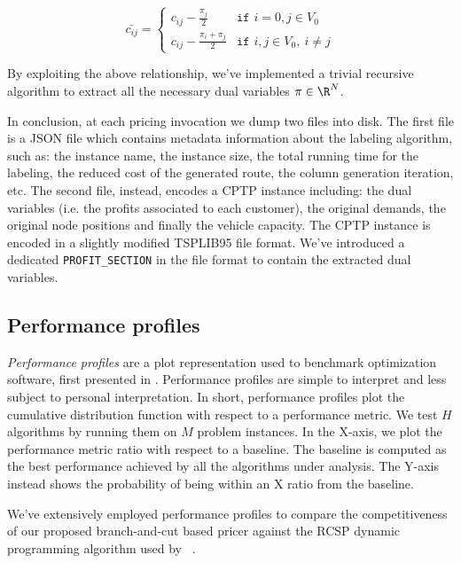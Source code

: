 \begin{equation}
	\bar{c_{ij}} = \begin{cases}
		c_{ij} - \frac{\pi_{j}}{2}       & \texttt{if } i = 0, j \in V_0       \\
		c_{ij} - \frac{\pi_i + \pi_j}{2} & \texttt{if } i, j \in V_0,\ i \ne j
	\end{cases}
\end{equation}

By exploiting the above relationship, we've implemented a trivial recursive algorithm
to extract all the necessary dual variables $\pi \in \R^N$.

In conclusion, at each pricing invocation we dump two files into disk.
The first file is a JSON file which contains metadata information about
the labeling algorithm, such as: the instance name, the instance size,
the total running time for the labeling, the reduced cost of the generated route,
the column generation iteration, etc.
The second file, instead, encodes a CPTP instance including:
the dual variables (i.e. the profits associated to each customer),
the original demands, the original node positions and finally the vehicle capacity.
The CPTP instance is encoded in a slightly modified TSPLIB95 file format.
We've introduced a dedicated \texttt{PROFIT\_SECTION} in the file format
to contain the extracted dual variables.

\subsection{Performance profiles}
\label{sec:results-performance-profiles}

\textit{Performance profiles} are a plot representation used to benchmark optimization software,
first presented in \textcite{dolan2002}.
Performance profiles are simple to interpret and less subject to personal interpretation.
In short, performance profiles plot the cumulative distribution function with respect to a performance metric.
We test $H$ algorithms by running them on $M$ problem instances.
In the X-axis, we plot the performance metric ratio with respect to a baseline.
The baseline is computed as the best performance achieved by all the algorithms under analysis.
The Y-axis instead shows the probability of being within an X ratio from the baseline.

\medskip

We've extensively employed performance profiles to compare the competitiveness of
our proposed branch-and-cut based pricer
against the RCSP dynamic programming algorithm used by \bapcod\ \parencite{pessoa2020generic}.

